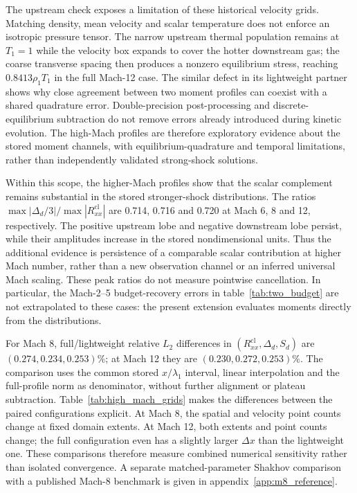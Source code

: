 \documentclass[lineno,paper]{JFM-FLM_Au}
\newenvironment{revision}{\begingroup\colorlet{shadecolor}{revisionyellow}\begin{shaded}}{\end{shaded}\endgroup}
\newenvironment{revision}{}{}
\newcommand{\cl}{\mathrm{cl}}
\begin{document}
\begin{revision}
The upstream check exposes a limitation of these historical velocity grids. Matching density, mean velocity and scalar temperature does not enforce an isotropic pressure tensor. The narrow upstream thermal population remains at $T_1=1$ while the velocity box expands to cover the hotter downstream gas; the coarse transverse spacing then produces a nonzero equilibrium stress, reaching $0.8413\rho_1T_1$ in the full Mach-12 case. The similar defect in its lightweight partner shows why close agreement between two moment profiles can coexist with a shared quadrature error. Double-precision post-processing and discrete-equilibrium subtraction do not remove errors already introduced during kinetic evolution. The high-Mach profiles are therefore exploratory evidence about the stored moment channels, with equilibrium-quadrature and temporal limitations, rather than independently validated strong-shock solutions.

Within this scope, the higher-Mach profiles show that the scalar complement remains substantial in the stored stronger-shock distributions. The ratios $\max|\Delta_d/3|/\max|R^{\cl}_{xx}|$ are 0.714, 0.716 and 0.720 at Mach 6, 8 and 12, respectively. The positive upstream lobe and negative downstream lobe persist, while their amplitudes increase in the stored nondimensional units. Thus the additional evidence is persistence of a comparable scalar contribution at higher Mach number, rather than a new observation channel or an inferred universal Mach scaling. These peak ratios do not measure pointwise cancellation. In particular, the Mach-2--5 budget-recovery errors in table~\ref{tab:two_budget} are not extrapolated to these cases: the present extension evaluates moments directly from the distributions.

For Mach 8, full/lightweight relative $L_2$ differences in $(R^{\cl}_{xx},\Delta_d,S_d)$ are $(0.274,0.234,0.253)\%$; at Mach 12 they are $(0.230,0.272,0.253)\%$. The comparison uses the common stored $x/\lambda_1$ interval, linear interpolation and the full-profile norm as denominator, without further alignment or plateau subtraction. Table~\ref{tab:high_mach_grids} makes the differences between the paired configurations explicit. At Mach 8, the spatial and velocity point counts change at fixed domain extents. At Mach 12, both extents and point counts change; the full configuration even has a slightly larger $\Delta x$ than the lightweight one. These comparisons therefore measure combined numerical sensitivity rather than isolated convergence. A separate matched-parameter Shakhov comparison with a published Mach-8 benchmark is given in appendix~\ref{app:m8_reference}.
\end{revision}
\end{document}
